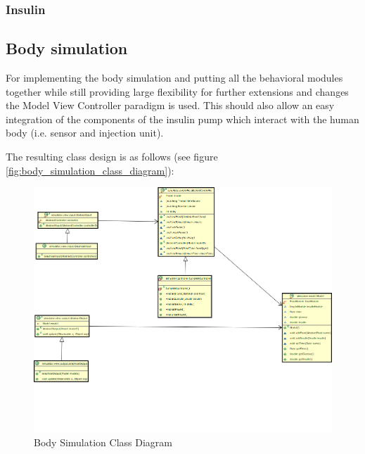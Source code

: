 \subsubsection{Insulin}

\newpage
\subsection{Body simulation}
For implementing the body simulation and putting all the behavioral modules
together while still providing large flexibility for further extensions and
changes the Model View Controller paradigm is used.
This should also allow an easy integration of the components of the insulin
pump which interact with the human body (i.e. sensor and injection unit).

The resulting class design is as follows  (see figure
\vref{fig:body_simulation_class_diagram}): 

\begin{figure}[htb]
\centering
\includegraphics[width=\textwidth]{images/body_simulation_classdiagram.png}
\caption{Body Simulation Class Diagram}
\label{fig:body_simulation_class_diagram}
\end{figure}
